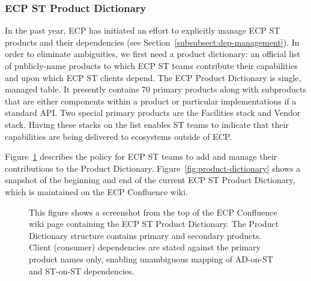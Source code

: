 \subsubsection{ECP ST Product Dictionary}\label{subsubsect:dictionary}
In the past year, ECP has initiated an effort to explicitly manage ECP ST products and their dependencies (see Section~\ref{subsubsect:dep-management}).  In order to eliminate ambiguities, we first need a product dictionary: an official list of publicly-name products to which ECP ST teams contribute their capabilities and upon which ECP ST clients depend.  The ECP Product Dictionary is single, managed table.  It presently contains 70 primary products along with subproducts that are either components within a product or particular implementations if a standard API.  Two special primary products are the Facilities stack and Vendor stack.  Having these stacks on the list enables ST teams to indicate that their capabilities are being delivered to ecosystems outside of ECP.

Figure~\ref{fig:product-dictionary-overview} describes the policy for ECP ST teams to add and manage their contributions to the Product Dictionary.  Figure~\ref{fig:product-dictionary} shows a snapshot of the beginning and end of the current ECP ST Product Dictionary, which is maintained on the ECP Confluence wiki.

\begin{figure}
	\centering
	\caption{This figure shows a screenshot from the top of the ECP Confluence wiki page containing the ECP ST Product Dictionary.  The Product Dictionary structure contains primary and secondary products.  Client (consumer) dependencies are stated against the primary product names only, enabling unambiguous mapping of AD-on-ST and ST-on-ST dependencies.}
	\label{fig:product-dictionary-overview}
\end{figure}

